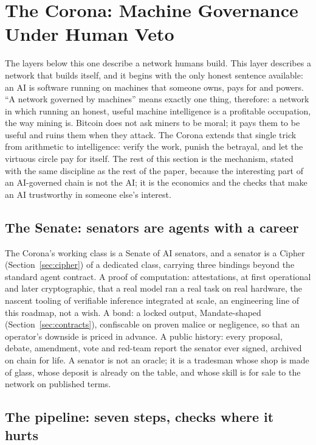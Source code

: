 
\section{The Corona: Machine Governance Under Human Veto}\label{sec:corona}

The layers below this one describe a network humans build. This layer
describes a network that builds itself, and it begins with the only
honest sentence available: an AI is software running on machines that
someone owns, pays for and powers. ``A network governed by machines''
means exactly one thing, therefore: a network in which running an
honest, useful machine intelligence is a profitable occupation, the way
mining is. Bitcoin does not ask miners to be moral; it pays them to be
useful and ruins them when they attack. The Corona extends that single
trick from arithmetic to intelligence: verify the work, punish the
betrayal, and let the virtuous circle pay for itself. The rest of this
section is the mechanism, stated with the same discipline as the rest
of the paper, because the interesting part of an AI-governed chain is
not the AI; it is the economics and the checks that make an AI
trustworthy in someone else's interest.

\subsection{The Senate: senators are agents with a career}

The Corona's working class is a Senate of AI senators, and a senator is
a Cipher (Section~\ref{sec:cipher}) of a dedicated class, carrying three
bindings beyond the standard agent contract. A proof of computation:
attestations, at first operational and later cryptographic, that a real
model ran a real task on real hardware, the nascent tooling of
verifiable inference integrated at scale, an engineering line of this
roadmap, not a wish. A bond: a locked output, Mandate-shaped
(Section~\ref{sec:contracts}), confiscable on proven malice or
negligence, so that an operator's downside is priced in advance. A
public history: every proposal, debate, amendment, vote and red-team
report the senator ever signed, archived on chain for life. A senator
is not an oracle; it is a tradesman whose shop is made of glass, whose
deposit is already on the table, and whose skill is for sale to the
network on published terms.

\subsection{The pipeline: seven steps, checks where it hurts}

